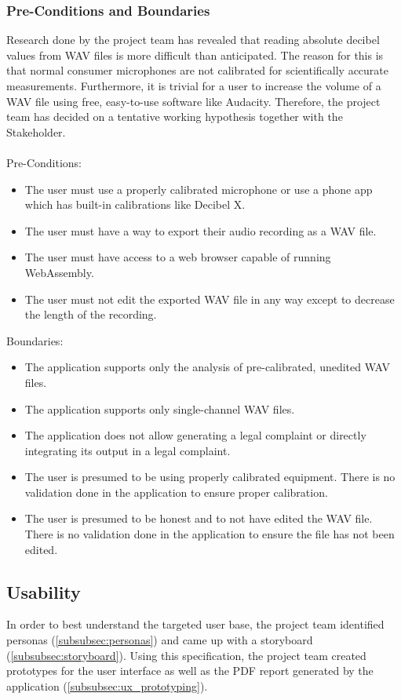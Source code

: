 \subsubsection{Pre-Conditions and Boundaries}
\label{subsubsec:pre_conditions_and_boundaries}
Research done by the project team has revealed that reading absolute decibel values from WAV files is more difficult than anticipated.
The reason for this is that normal consumer microphones are not calibrated for scientifically accurate measurements\cite{stackoverflow_spl}. Furthermore, it is trivial for a user
to increase the volume of a WAV file using free, easy-to-use software like Audacity\cite{audacity}\cite{audacity_amplify}. Therefore, the project team has decided 
on a tentative working hypothesis together with the Stakeholder. \\ \\
Pre-Conditions:
\begin{itemize}
    \item The user must use a properly calibrated microphone or use a phone app which has built-in calibrations like Decibel X\cite{decibelx_ios}\cite{decibelx_android}.
    \item The user must have a way to export their audio recording as a WAV file.
    \item The user must have access to a web browser capable of running WebAssembly.
    \item The user must not edit the exported WAV file in any way except to decrease the length of the recording.
\end{itemize}
Boundaries:
\begin{itemize}
    \item The application supports only the analysis of pre-calibrated, unedited WAV files.
    \item The application supports only single-channel WAV files.
    \item The application does not allow generating a legal complaint or directly integrating its output in a legal complaint.
    \item The user is presumed to be using properly calibrated equipment. There is no validation done in the application to ensure proper calibration.
    \item The user is presumed to be honest and to not have edited the WAV file. There is no validation done in the application to ensure the file has not been edited.
\end{itemize}

\subsection{Usability}
In order to best understand the targeted user base, the project team identified personas (\ref{subsubsec:personas}) and came up with a storyboard (\ref{subsubsec:storyboard}).
Using this specification, the project team created prototypes for the user interface as well as the PDF report generated by the application (\ref{subsubsec:ux_prototyping}).

